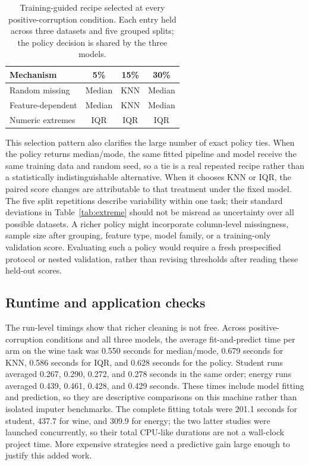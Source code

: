\documentclass[conference]{IEEEtran}
\begin{document}
\begin{table}[t]\centering\caption{Training-guided recipe selected at every positive-corruption condition. Each entry held across three datasets and five grouped splits; the policy decision is shared by the three models.}\label{tab:decisions}\footnotesize
\begin{tabular}{lccc}\toprule
Mechanism & 5\% & 15\% & 30\%\\\midrule
Random missing & Median & KNN & Median\\
Feature-dependent & Median & KNN & Median\\
Numeric extremes & IQR & IQR & IQR\\\bottomrule
\end{tabular}
\end{table}

This selection pattern also clarifies the large number of exact policy ties. When the policy returns median/mode, the same fitted pipeline and model receive the same training data and random seed, so a tie is a real repeated recipe rather than a statistically indistinguishable alternative. When it chooses KNN or IQR, the paired score changes are attributable to that treatment under the fixed model. The five split repetitions describe variability within one task; their standard deviations in Table~\ref{tab:extreme} should not be misread as uncertainty over all possible datasets. A richer policy might incorporate column-level missingness, sample size after grouping, feature type, model family, or a training-only validation score. Evaluating such a policy would require a fresh prespecified protocol or nested validation, rather than revising thresholds after reading these held-out scores.

\subsection{Runtime and application checks}
The run-level timings show that richer cleaning is not free. Across positive-corruption conditions and all three models, the average fit-and-predict time per arm on the wine task was 0.550 seconds for median/mode, 0.679 seconds for KNN, 0.586 seconds for IQR, and 0.628 seconds for the policy. Student runs averaged 0.267, 0.290, 0.272, and 0.278 seconds in the same order; energy runs averaged 0.439, 0.461, 0.428, and 0.429 seconds. These times include model fitting and prediction, so they are descriptive comparisons on this machine rather than isolated imputer benchmarks. The complete fitting totals were 201.1 seconds for student, 437.7 for wine, and 309.9 for energy; the two latter studies were launched concurrently, so their total CPU-like durations are not a wall-clock project time. More expensive strategies need a predictive gain large enough to justify this added work.
\end{document}
